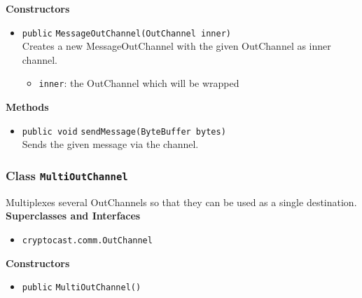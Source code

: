 \textbf{Constructors}
\begin{itemize}
\item \lstinline|public| \lstinline|MessageOutChannel|\lstinline|(OutChannel inner)|\\
Creates a new MessageOutChannel with the given OutChannel as inner channel.
\begin{itemize}
\item \lstinline|inner|: the OutChannel which will be wrapped
\end{itemize}



\end{itemize}


\textbf{Methods}
\begin{itemize}
\item \lstinline|public void| \lstinline|sendMessage|\lstinline|(ByteBuffer bytes)|\\
Sends the given message via the channel.



\end{itemize}

\subsubsection{Class \lstinline|MultiOutChannel|}
Multiplexes several OutChannels so that they can be used as a single
 destination. \\


\textbf{Superclasses and Interfaces}
\begin{itemize}
\item \lstinline|cryptocast.comm.OutChannel|
\end{itemize}



\textbf{Constructors}
\begin{itemize}
\item \lstinline|public| \lstinline|MultiOutChannel|\lstinline|()|




\end{itemize}


